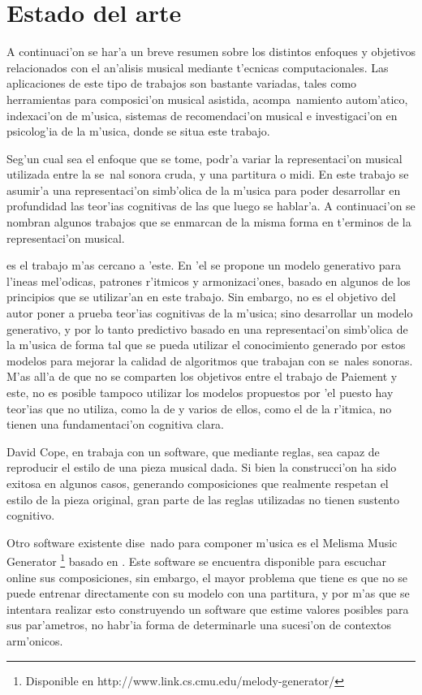 \section{Estado del arte}
A continuaci'on se har'a un breve resumen sobre los distintos enfoques y objetivos relacionados con el an'alisis musical mediante
t'ecnicas computacionales. Las aplicaciones de este tipo de trabajos son bastante variadas, tales como herramientas para 
composici'on musical asistida, acompa~namiento autom'atico, indexaci'on de m'usica, sistemas de recomendaci'on musical e 
investigaci'on en psicolog'ia de la m'usica, donde se situa este trabajo.

Seg'un cual sea el enfoque que se tome, podr'a variar la representaci'on musical utilizada entre la se~nal sonora cruda, y una partitura o midi.
En este trabajo se asumir'a una representaci'on simb'olica de la m'usica para poder desarrollar en profundidad las teor'ias cognitivas de las 
que luego se hablar'a. A continuaci'on se nombran algunos trabajos que se enmarcan de la misma forma en t'erminos de la representaci'on musical.

\cite{PaieThesis} es el trabajo m'as cercano a 'este. En 'el se propone un modelo generativo para l'ineas mel'odicas, 
patrones r'itmicos y armonizaci'ones, basado en algunos de los principios que se utilizar'an en este trabajo. 
Sin embargo, no es el objetivo del autor poner a prueba teor'ias cognitivas de la m'usica; sino desarrollar un modelo generativo,
y por lo tanto predictivo basado en una representaci'on simb'olica de la m'usica de forma tal que se pueda utilizar el conocimiento generado por estos
modelos para mejorar la calidad de algoritmos que trabajan con se~nales sonoras. M'as all'a de que no se comparten los objetivos entre el trabajo de 
Paiement y este, no es posible tampoco utilizar los modelos propuestos por 'el puesto hay teor'ias que no utiliza, como la de \citealp{Lerdahl2001} 
y varios de ellos, como el de la r'itmica, no tienen una fundamentaci'on cognitiva clara.

David Cope, en \cita trabaja con un software, que mediante reglas, sea capaz de reproducir el estilo de una pieza musical dada. Si bien 
la construcci'on ha sido exitosa en algunos casos, generando composiciones que realmente respetan el estilo de la pieza original, gran
parte de las reglas utilizadas no tienen sustento cognitivo.

Otro software existente dise~nado para componer m'usica es el Melisma Music Generator
\footnote{Disponible en http://www.link.cs.cmu.edu/melody-generator/} basado en \cite{Temperley2004}. 
Este software se encuentra disponible para escuchar online sus composiciones, sin embargo, el mayor problema 
que tiene es que no se puede entrenar directamente con su modelo con una partitura, y por m'as que se intentara realizar esto construyendo un software 
que estime valores posibles para sus par'ametros, no habr'ia forma de determinarle una sucesi'on de contextos arm'onicos.

